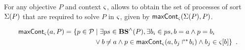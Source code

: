 \begin{comment}
\begin{definition}[$\uconcr: \powerset(\OS) \mapsto \powerset(\Sce)$]
\label{def:uconcr-set}
  $\uconcr(\Omega) = \{ \delta \in \uconcr(\w) \mid \w \in \Omega\}$
\end{definition}
\end{comment}

For any objective $P$ and context $\varsigma$,  allows to obtain the set of processes of sort $\Sigma(P)$ that are required to solve $P$ in $\varsigma$,
given by $\mathsf{maxCont}_\varsigma(\Sigma(P), P)$.
\begin{comment}
\begin{definition}
\label{def:allprocs}
  \begin{align*}
  \allprocs(\V, \E) = \{ p \in \PHproc &\mid p \in \V \vee \exists P \in \V \cap \Obj,\\
  &\qquad p = \PHtarget(P) \vee p = \PHbounce(P) \}
  \end{align*}
  \begin{align*}
  \allprocs(\V, \E) = (V \cap \Proc) \cup \{ \PHtarget(P), \PHbounce(P) \mid P \in \V \cap \Obj \}
  \end{align*}
\end{definition}
\end{comment}
%
\begin{comment}
\begin{definition} \todo{À revoir avec la nouvelle sémantique}
\label{def:allprocs}
  \begin{align*}
  &\allprocs((\cwSol,\cwReq,\cwRSP,\cwCont)) = \{ p \in \PHproc \mid \exists (P,ps) \in \cwSol, \\
    &\qquad\qquad p \in ps \vee p = \PHtarget(P) \vee p = \PHbounce(P) \\
    &\qquad\qquad \vee \exists (a_i,ps) \in \cwRSP, p \in ps \}
  \end{align*}
\end{definition}
\end{comment}
%
%
%
\begin{definition}[$\gCont_\ctx : \Sigma \times \Obj \mapsto \powerset(\PHproc)$]
  \label{def:maxCont}
  \begin{align*}
    \mathsf{maxCont}_\varsigma(a,P) = 
    \{ p \in \mathcal{P} &\mid \exists ps \in \mathbf{BS}^\wedge(P), \exists b_i \in ps, b = a \wedge p = b_i \\
      & \vee b \not\nobreak\mkern -2mu = a \wedge p \in \mathsf{maxCont}_\varsigma(a, \mbox{$b_j\Rsh^*\!b_i$}) \wedge b_j \in {\varsigma[b]} \}
    \enspace.
  \end{align*}
\end{definition}

